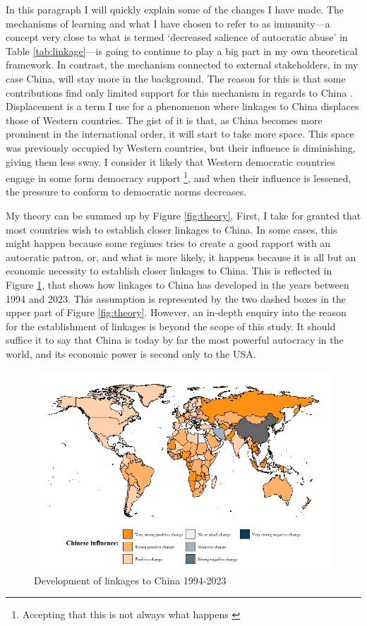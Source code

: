 In this paragraph I will quickly explain some of the changes I have made. The mechanisms of learning and what I have chosen to refer to as immunity---a concept very close to what is termed `decreased salience of autocratic abuse' in Table \ref{tab:linkage}---is going to continue to play a big part in my own theoretical framework. In contrast, the mechanism connected to external stakeholders, in my case China, will stay more in the background. The reason for this is that some contributions find only limited support for this mechanism in regards to China \citep{chen_democracy_2015}. Displacement is a term I use for a phenomenon where linkages to China displaces those of Western countries. The gist of it is that, as China becomes more prominent in the international order, it will start to take more space. This space was previously occupied by Western countries, but their influence is diminishing, giving them less sway. I consider it likely that Western democratic countries engage in some form democracy support \citep{levitsky_linkage_2006}\footnote{Accepting that this is not always what happens \citep{chen_democracy_2015, wong_chinese_2019}}, and when their influence is lessened, the pressure to conform to democratic norms decreases.

My theory can be summed up by Figure \ref{fig:theory}. First, I take for granted that most countries wish to establish closer linkages to China. In some cases, this might happen because some regimes tries to create a good rapport with an autocratic patron, or, and what is more likely, it happens because it is all but an economic necessity to establish closer linkages to China. This is reflected in Figure \ref{fig:link-china}, that shows how linkages to China has developed in the years between 1994 and 2023. This assumption is represented by the two dashed boxes in the upper part of Figure \ref{fig:theory}. However, an in-depth enquiry into the reason for the establishment of linkages is beyond the scope of this study. It should suffice it to say that China is today by far the most powerful autocracy in the world, and its economic power is second only to the USA. 

\begin{figure}
    \centering
    \includegraphics[width=\linewidth]{graphics/chinese_influence.jpeg}
    \caption{Development of linkages to China 1994-2023}
    \label{fig:link-china}
\end{figure}

